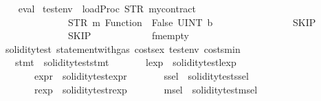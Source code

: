 \begin{isabellebody}
%
\isadelimproof
\ \ %
\endisadelimproof
%
\isatagproof
{}\isamarkupfalse%
\ eval%
\endisatagproof
{\isafoldproof}%
%
\isadelimproof
\isanewline
%
\endisadelimproof
\isanewline
{}\isamarkupfalse%
\ {\isachardoublequoteopen}testenv{}\ {\isasymequiv}\ loadProc\ {\isacharparenleft}{\kern0pt}STR\ {\isacharprime}{\kern0pt}{\isacharprime}{\kern0pt}mycontract{\isacharprime}{\kern0pt}{\isacharprime}{\kern0pt}{\isacharparenright}{\kern0pt}\isanewline
\ \ \ \ \ \ \ \ \ \ \ \ \ \ {\isacharparenleft}{\kern0pt}{\isacharbrackleft}{\kern0pt}{\isacharparenleft}{\kern0pt}STR\ {\isacharprime}{\kern0pt}{\isacharprime}{\kern0pt}m{}{\isacharprime}{\kern0pt}{\isacharprime}{\kern0pt}{\isacharcomma}{\kern0pt}\ Function\ {\isacharparenleft}{\kern0pt}{\isacharbrackleft}{\kern0pt}{\isacharbrackright}{\kern0pt}{\isacharcomma}{\kern0pt}\ False{\isacharcomma}{\kern0pt}\ UINT\ b{}\ {}{\isacharparenright}{\kern0pt}{\isacharparenright}{\kern0pt}{\isacharbrackright}{\kern0pt}{\isacharcomma}{\kern0pt}\isanewline
\ \ \ \ \ \ \ \ \ \ \ \ \ \ {\isacharparenleft}{\kern0pt}{\isacharbrackleft}{\kern0pt}{\isacharbrackright}{\kern0pt}{\isacharcomma}{\kern0pt}\ SKIP{\isacharparenright}{\kern0pt}{\isacharcomma}{\kern0pt}\isanewline
\ \ \ \ \ \ \ \ \ \ \ \ \ \ SKIP{\isacharparenright}{\kern0pt}\isanewline
\ \ \ \ \ \ \ \ \ \ \ \ fmempty{\isachardoublequoteclose}\isanewline
\isanewline
{}\isamarkupfalse%
\ soliditytest{}{\isacharcolon}{\kern0pt}\ statement{\isacharunderscore}{\kern0pt}with{\isacharunderscore}{\kern0pt}gas\ costs{\isacharunderscore}{\kern0pt}ex\ testenv{}\ costs{\isacharunderscore}{\kern0pt}min\isanewline
\ \ \ stmt{}\ {\isacharequal}{\kern0pt}\ {\isachardoublequoteopen}soliditytest{}{\isachardot}{\kern0pt}stmt{\isachardoublequoteclose}\isanewline
\ \ \ \ \ \ \ lexp{}\ {\isacharequal}{\kern0pt}\ soliditytest{}{\isachardot}{\kern0pt}lexp\ \isanewline
\ \ \ \ \ \ \ expr{}\ {\isacharequal}{\kern0pt}\ soliditytest{}{\isachardot}{\kern0pt}expr\isanewline
\ \ \ \ \ \ \ ssel{}\ {\isacharequal}{\kern0pt}\ soliditytest{}{\isachardot}{\kern0pt}ssel\isanewline
\ \ \ \ \ \ \ rexp{}\ {\isacharequal}{\kern0pt}\ soliditytest{}{\isachardot}{\kern0pt}rexp\isanewline
\ \ \ \ \ \ \ msel{}\ {\isacharequal}{\kern0pt}\ soliditytest{}{\isachardot}{\kern0pt}msel\isanewline

\end{isabellebody}
